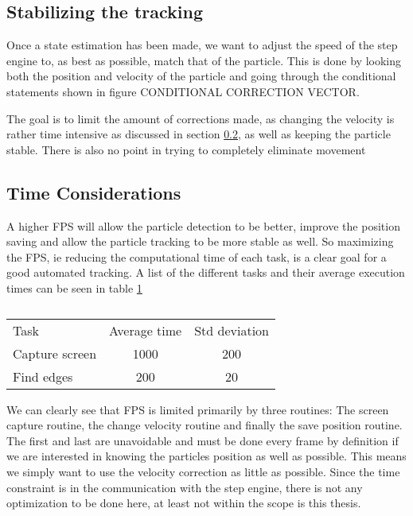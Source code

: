 \subsection{Stabilizing the tracking}
Once a state estimation has been made, we want to adjust the speed of the step engine to, as best as possible, match that of the particle. This is done by looking both the position and velocity of the particle and going through the conditional statements shown in figure CONDITIONAL CORRECTION VECTOR. 

The goal is to limit the amount of corrections made, as changing the velocity is rather time intensive as discussed in section \ref{sec:time considerations}, as well as keeping the particle stable. There is also no point in trying to completely eliminate movement

\subsection{Time Considerations}\label{sec:time considerations}
A higher FPS will allow the particle detection to be better, improve the position saving and allow the particle tracking to be more stable as well. So maximizing the FPS, ie reducing the computational time of each task, is a clear goal for a good automated tracking. A list of the different tasks and their average execution times can be seen in table \ref{tab:benchmarks}

\begin{table}[H]
 \begin{tabular}{l | c | c } 
 Task  			&  Average time & Std deviation \\
 Capture screen & 1000 			& 200 \\
 Find edges 	& 200			& 20 \\
 \end{tabular}
 \caption{}
 \label{tab:benchmarks}
\end{table}

We can clearly see that FPS is limited primarily by three routines: The screen capture routine, the change velocity routine and finally the save position routine. The first and last are unavoidable and must be done every frame by definition if we are interested in knowing the particles position as well as possible. This means we simply want to use the velocity correction as little as possible. Since the time constraint is in the communication with the step engine, there is not any optimization to be done here, at least not within the scope is this thesis. 
